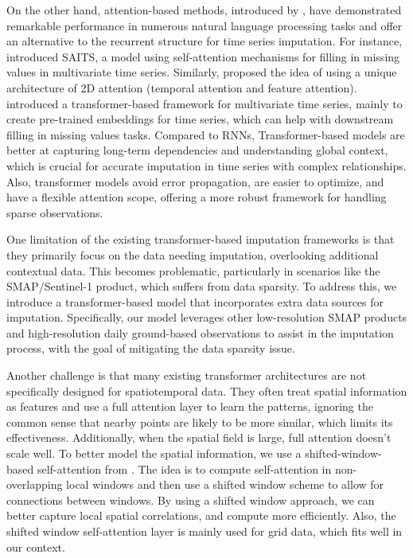 \documentclass[11pt]{article}
\begin{document}
On the other hand, attention-based methods, introduced by \citet{vaswani2017attention}, have demonstrated remarkable performance in numerous natural language processing tasks and offer an alternative to the recurrent structure for time series imputation. For instance,\citet{du2023saits} introduced SAITS, a model using self-attention mechanisms for filling in missing values in multivariate time series. Similarly, \citet{tashiro2021csdi} proposed the idea of using a unique architecture of 2D attention (temporal attention and feature attention).  \citet{yildiz2022multivariate} introduced a transformer-based framework for multivariate time series, mainly to create pre-trained embeddings for time series, which can help with downstream filling in missing values tasks. Compared to RNNs, Transformer-based models are better at capturing long-term dependencies and understanding global context, which is crucial for accurate imputation in time series with complex relationships. Also, transformer models avoid error propagation, are easier to optimize, and have a flexible attention scope, offering a more robust framework for handling sparse observations. 


One limitation of the existing transformer-based imputation frameworks is that they primarily focus on the data needing imputation, overlooking additional contextual data. This becomes problematic, particularly in scenarios like the SMAP/Sentinel-1 product, which suffers from data sparsity. To address this, we introduce a transformer-based model that incorporates extra data sources for imputation. Specifically, our model leverages other low-resolution SMAP products and high-resolution daily ground-based observations to assist in the imputation process, with the goal of mitigating the data sparsity issue. 


Another challenge is that many existing transformer architectures are not specifically designed for spatiotemporal data. They often treat spatial information as features and use a full attention layer to learn the patterns, ignoring the common sense that nearby points are likely to be more similar, which limits its effectiveness. Additionally, when the spatial field is large, full attention doesn't scale well. To better model the spatial information, we use a shifted-window-based self-attention from \citet{liu2021swin}. The idea is to compute self-attention in non-overlapping local windows and then use a shifted window scheme to allow for connections between windows. By using a shifted window approach, we can better capture local spatial correlations, and compute more efficiently. Also, the shifted window self-attention layer is mainly used for grid data, which fits well in our context.
\end{document}

